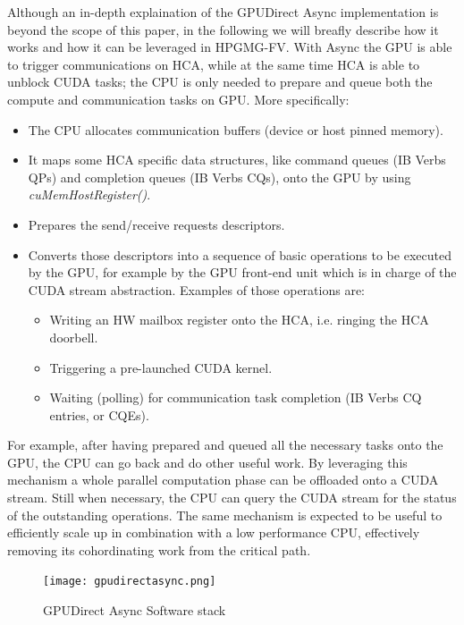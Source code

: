 \documentclass[conference]{IEEEtran}
\begin{document}
Although an in-depth explaination of the GPUDirect Async implementation is beyond the scope of this paper, in the following we will breafly describe how it works and how it can be leveraged in HPGMG-FV.
With Async the GPU is able to trigger communications on HCA, while at the same time HCA is able to unblock CUDA tasks; the CPU is only needed to prepare and queue both the compute and communication tasks on GPU. 
%
More specifically:
\begin{itemize}

\item The CPU allocates communication buffers (device or host pinned memory).

\item It maps some HCA specific data structures, like command queues (IB
  Verbs QPs) and completion queues (IB Verbs CQs), onto the GPU by using
  \textit{cuMemHostRegister()}.

\item Prepares the send/receive requests descriptors.

\item Converts those descriptors into a sequence of basic operations to be
  executed by the GPU, for example by the GPU front-end unit which is in
  charge of the CUDA stream abstraction. Examples of those operations are:

  \begin{itemize}
  \item Writing an HW mailbox register onto the HCA, i.e. ringing the HCA doorbell.
  \item Triggering a pre-launched CUDA kernel.
  \item Waiting (polling) for communication task completion (IB Verbs CQ entries, or CQEs).
  \end{itemize}

\end{itemize}

For example, after having prepared and queued all the necessary tasks onto
the GPU, the CPU can go back and do other useful work.
% 
By leveraging this mechanism a whole parallel computation phase can be
offloaded onto a CUDA stream.
%
Still when necessary, the CPU can query the CUDA stream for the status of
the outstanding operations.
% 
The same mechanism is expected to be useful to efficiently scale up in
combination with a low performance CPU, effectively removing its
cohordinating work from the critical path.

\begin{figure}[h]
\centering
\texttt{[image: gpudirectasync.png]}
\caption{GPUDirect Async Software stack}
\label{fig:gpudirectasync}
\end{figure}
\end{document}
